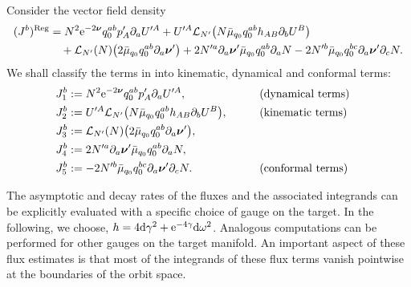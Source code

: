 \documentclass[11pt]{article}
\numberwithin{equation}{section}
\def\ptl{\partial}%
\def\mbo#1{\boldsymbol{#1}}%
\numberwithin{equation}{section}
\begin{document}
 Consider the vector field density
 \begin{align*}
 	(J^b)^{{\rm Reg}}&{}= N^2 {\rm e}^{-2 \mbo{\nu}} q^{ab}_0 p'_A \ptl_a U'^A + U'^A \mathcal{L}_{N'} \bigl(N \bar{\mu}_{q_0} q^{ab}_0 h_{AB} \ptl_b U^B\bigr) \notag\\
 	&\quad{}+ \mathcal{L}_{N'} (N) \bigl(2 \bar{\mu}_{q_0} q^{ab}_0 \ptl_a \mbo{\nu}'\bigr) + 2 N'^a \ptl_a \mbo{\nu}' \bar{\mu}_{q_0} q^{ab}_0 \ptl_a N
 - 2 N'^b \bar{\mu}_{q_0} q^{bc}_0 \ptl_a \mbo{\nu}' \ptl_c N.
 	\end{align*}
 We shall classify the terms in  into kinematic, dynamical and conformal terms:
 \begin{alignat*}{3}
 	&J_1^b := N^2 {\rm e}^{-2 \mbo{\nu}} q^{ab}_0 p'_A \ptl_a U'^A, \qquad && \text{(dynamical terms)}& \\
 	&J_2^b := U'^A \mathcal{L}_{N'} \bigl(N \bar{\mu}_{q_0} q^{ab}_0 h_{AB} \ptl_b U^B\bigr), \qquad && \text{(kinematic terms)}& \\
 	&J_3^b := \mathcal{L}_{N'} (N) \bigl(2 \bar{\mu}_{q_0} q^{ab}_0 \ptl_a \mbo{\nu}'\bigr), &&& \\
 	&J_4^b := 2 N'^a \ptl_a \mbo{\nu}' \bar{\mu}_{q_0} q^{ab}_0 \ptl_a N, &&&\\
 	&J_5^b := - 2 N'^b \bar{\mu}_{q_0} q^{bc}_0 \ptl_a \mbo{\nu}' \ptl_c N. \qquad && \text{(conformal terms)}
 	\end{alignat*}

The asymptotic and decay rates of the fluxes and the associated integrands can be explicitly evaluated with a specific choice of gauge on the target. In the following, we choose, $h = 4 {\rm d}\gamma ^2 + {\rm e}^{-4 \gamma } {\rm d} \omega^2$. Analogous computations can be performed for other gauges on the target manifold. An important aspect of these flux estimates is that most of the integrands of these flux terms vanish pointwise at the boundaries of the orbit space. %
\end{document}
